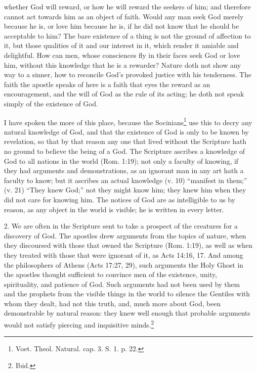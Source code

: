 \documentclass[a5paper]{book}
\begin{document}
    whether God will reward, 
    or how he will reward the seekers of him; 
    and therefore cannot act towards him as an object of faith. 
Would any man seek God merely because he is, 
    or love him because he is, 
    if he did not know that he should be acceptable to him?
The bare existence of a thing is not the ground of affection to it, 
    but those qualities of it and our interest in it, 
    which render it amiable and delightful. 
How can men, 
    whose consciences fly in their faces seek God or love him, 
    without this knowledge that he is a rewarder? 
Nature doth not show any way to a sinner, 
    how to reconcile God’s provoked justice with his tenderness. 
The faith the apostle speaks of here is 
    a faith that eyes the reward as an encouragement, 
    and the will of God as the rule of its acting; 
    he doth not speak simply of the existence of God.

I have spoken the more of this place, 
    because the Socinians\footnote{Voet. Theol. Natural. cap. 3. S. 1. p. 22.} 
    use this to decry any natural knowledge of God, 
    and that the existence of God is only to be known by revelation, 
    so that by that reason any one that lived without the Scripture 
    hath no ground to believe the being of a God. 
The Scripture ascribes a knowledge of God 
    to all nations in the world (Rom. 1:19); 
    not only a faculty of knowing, 
    if they had arguments and demonstrations, 
    as an ignorant man in any art hath a faculty to know; 
    but it ascribes an actual knowledge (v. 10) ``manifest in them;'' 
    (v. 21) ``They knew God;'' not they might know him; 
    they knew him when they did not care for knowing him. 
The notices of God are as intelligible to us by reason, 
    as any object in the world is visible; 
    he is written in every letter.

2. We are often in the Scripture sent 
    to take a prospect of the creatures for a discovery of God. 
The apostles drew arguments from the topics of nature, 
    when they discoursed with those that owned the Scripture (Rom. 1:19), 
    as well as when they treated with those that were ignorant of it, 
    as Acts 14:16, 17. 
And among the philosophers of Athens (Acts 17:27, 29), 
    such arguments the Holy Ghost in the apostles thought sufficient 
    to convince men of the existence, unity, spirituality, and patience of God. 
Such arguments had not been used by them and the prophets 
    from the visible things in the world to silence the Gentiles 
    with whom they dealt, 
    had not this truth, and, much more about God, 
    been demonstrable by natural reason: 
    they knew well enough that probable arguments 
    would not satisfy piercing and inquisitive minds.\footnote{Ibid.}
\end{document}

